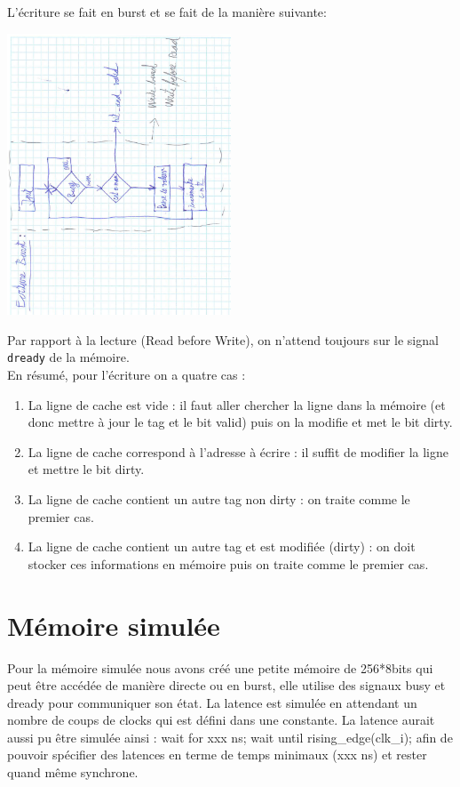 \documentclass[10pt,a4paper]{article}
\begin{document}
L'écriture se fait en burst et se fait de la manière suivante:  
\begin{center}

\includegraphics[width=0.5\textwidth, angle=-90]{images/mss_write}

\end{center}
Par rapport à la lecture (Read before Write), on n'attend toujours sur le signal \texttt{dready} de la mémoire.\\

En résumé, pour l'écriture on a quatre cas :
\begin{enumerate}
\item La ligne de cache est vide : il faut aller chercher la ligne dans la mémoire (et donc mettre à jour le tag et le bit valid) puis on la modifie et met le bit dirty.
\item La ligne de cache correspond à l'adresse à écrire : il suffit de modifier la ligne et mettre le bit dirty.
\item La ligne de cache contient un autre tag non dirty : on traite comme le premier cas.
\item La ligne de cache contient un autre tag et est modifiée (dirty) : on doit stocker ces informations en mémoire puis on traite comme le premier cas.
\end{enumerate}

\section{Mémoire simulée}
Pour la mémoire simulée nous avons créé une petite mémoire de 256*8bits qui peut être accédée de manière directe ou en burst, elle utilise des signaux busy et dready pour communiquer son état. La latence est simulée en attendant un nombre de coups de clocks qui est défini dans une constante. La latence aurait aussi pu être simulée ainsi : wait for xxx ns; wait until rising\_edge(clk\_i); afin de pouvoir spécifier des latences en terme de temps minimaux (xxx ns) et rester quand même synchrone.
\end{document}
